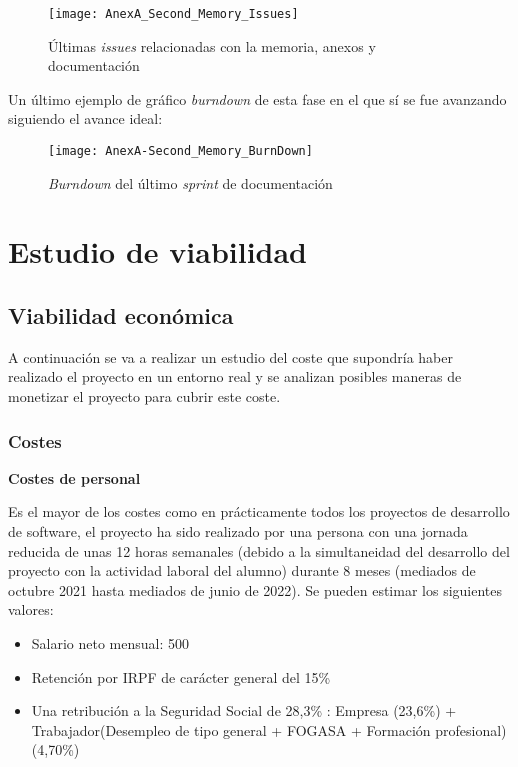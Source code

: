 \begin{figure}[!h]
	\centering
	\texttt{[image: AnexA\_Second\_Memory\_Issues]}
	\caption{Últimas \textit{issues} relacionadas con la memoria, anexos y documentación}
	\label{fig:AnexA_Second_Memory_Issues}
\end{figure}
\FloatBarrier

Un último ejemplo de gráfico \textit{burndown} de esta fase en el que sí se fue avanzando siguiendo el avance ideal:

\begin{figure}[!h]
	\centering
	\texttt{[image: AnexA-Second\_Memory\_BurnDown]}
	\caption{\textit{Burndown} del último \textit{sprint} de documentación}
	\label{fig:AnexA-Second_Memory_BurnDown}
\end{figure}
\FloatBarrier


\section{Estudio de viabilidad}
\subsection{Viabilidad económica}
A continuación se va a realizar un estudio del coste que supondría haber realizado el proyecto en un entorno real y se analizan posibles maneras de monetizar el proyecto para cubrir este coste.

\subsubsection{Costes}
\textbf{Costes de personal}

Es el mayor de los costes como en prácticamente todos los proyectos de desarrollo de software, el proyecto ha sido realizado por una persona con una jornada reducida de unas 12 horas semanales (debido a la simultaneidad del desarrollo del proyecto con la actividad laboral del alumno) durante 8 meses (mediados de octubre 2021 hasta mediados de junio de 2022). Se pueden estimar los siguientes valores:
\begin{itemize}
	\tightlist
	\item Salario neto mensual: 500 \officialeuro
	\item Retención por IRPF de carácter general del 15\% \cite{agencia_tributaria_cuadro_2022}
	\item Una retribución a la Seguridad Social de 28,3\% \cite{ministerio_de_empleo_y_seguridad_social_bases_2022}: Empresa (23,6\%) +  Trabajador(Desempleo de tipo general + FOGASA + Formación profesional)(4,70\%)
\end{itemize}


